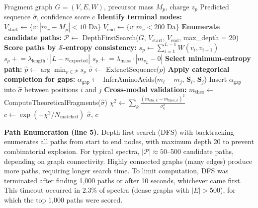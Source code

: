 \documentclass[11pt,twocolumn]{article}
\newcommand{\sentropy}{$\mathcal{S}$-entropy}
\begin{document}
\begin{algorithm}[h]
\caption{Minimum-Entropy Sequence Reconstruction}
\label{alg:sequence}
\begin{algorithmic}[1]
\Require Fragment graph $G = (V, E, W)$, precursor mass $M_p$, charge $z_p$
\Ensure Predicted sequence $\hat{\sigma}$, confidence score $c$
\State \textbf{Identify terminal nodes:}
\State $V_{\text{start}} \gets \{v : |m_v - M_p| < 10 \text{ Da}\}$ 
\State $V_{\text{end}} \gets \{v : m_v < 200 \text{ Da}\}$ 
\State \textbf{Enumerate candidate paths:}
\State $\mathcal{P} \gets$ DepthFirstSearch($G$, $V_{\text{start}}$, $V_{\text{end}}$, max\_depth = 20)
\State {}
\State \textbf{Score paths by \sentropy{} consistency:}
    \State $s_p \gets \sum_{i=1}^{L-1} W(v_i, v_{i+1})$ \Comment{Sum of edge weights (\sentropy{} distances)}
    \State $s_p \mathrel{+}= \lambda_{\text{length}} \cdot |L - n_{\text{expected}}|$ 
    \State $s_p \mathrel{+}= \lambda_{\text{mass}} \cdot |m_{v_L} - 0|$ 
\EndFor
\State \textbf{Select minimum-entropy path:}
\State $\hat{p} \gets \arg\min_{p \in \mathcal{P}} s_p$ 
\State $\hat{\sigma} \gets$ ExtractSequence($\hat{p}$) 
\State \textbf{Apply categorical completion for gaps:}
    \State $\alpha_{\text{gap}} \gets$ InferAminoAcids($m_i - m_j$, $\mathbf{S}_i$, $\mathbf{S}_j$)
    \State Insert $\alpha_{\text{gap}}$ into $\hat{\sigma}$ between positions $i$ and $j$
\EndFor
\State \textbf{Cross-modal validation:}
\State $m_{\text{theo}} \gets$ ComputeTheoreticalFragments($\hat{\sigma}$) 
\State $\chi^2 \gets \sum_{k} \frac{(m_{\text{obs}, k} - m_{\text{theo}, k})^2}{\sigma_k^2}$ 
\State $c \gets \exp(-\chi^2 / N_{\text{matched}})$ 
\State \Return $\hat{\sigma}$, $c$
\end{algorithmic}
\end{algorithm}

\textbf{Path Enumeration (line 5).} Depth-first search (DFS) with backtracking enumerates all paths from start to end nodes, with maximum depth 20 to prevent combinatorial explosion. For typical spectra, $|\mathcal{P}| \approx 50$--500 candidate paths, depending on graph connectivity. Highly connected graphs (many edges) produce more paths, requiring longer search time. To limit computation, DFS was terminated after finding 1,000 paths or after 10 seconds, whichever came first. This timeout occurred in 2.3\% of spectra (dense graphs with $|E| > 500$), for which the top 1,000 paths were scored.
\end{document}
